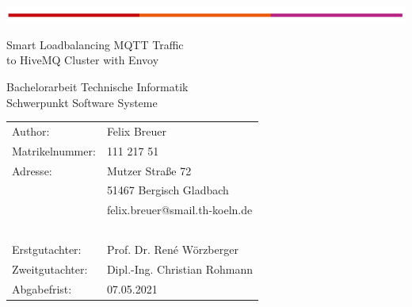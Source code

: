 \begin{titlepage}
\begin{flushleft}
	\vspace*{-1cm}
	\includegraphics[scale=1]{images/th-bar.png}\\
	\vspace*{1cm}
\end{flushleft}
\begin{center}
\begin{huge}
Smart Loadbalancing MQTT Traffic\\
to HiveMQ Cluster with Envoy\\
\end{huge}
\vspace{2cm}
Bachelorarbeit Technische Informatik\\
Schwerpunkt Software Systeme
\end{center}
\vspace{4cm}
\noindent\begin{tabular}{ll}
	Author: & Felix Breuer \\
	Matrikelnummer: &	111 217 51 \\
	Adresse: & Mutzer Stra{\ss}e 72 \\
	~ &	51467 Bergisch Gladbach \\
	~ &	felix.breuer@smail.th-koeln.de \\
	~ & ~ \\
	Erstgutachter: & Prof. Dr. René Wörzberger \\
	Zweitgutachter: & Dipl.-Ing. Christian Rohmann \\
	Abgabefrist: & 07.05.2021 \\
\end{tabular}
~\\
~\\
~\\
~\\
~\\
~\\
\end{titlepage}
\newpage
